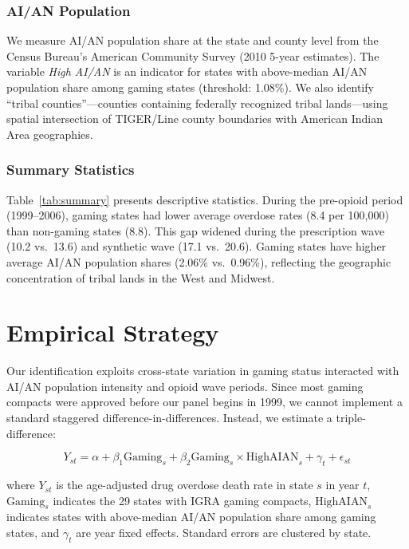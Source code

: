 \documentclass[12pt]{article}
\begin{document}
\subsubsection*{AI/AN Population} We measure AI/AN population share at the state and county level from the Census Bureau's American Community Survey (2010 5-year estimates). The variable \textit{High AI/AN} is an indicator for states with above-median AI/AN population share among gaming states (threshold: 1.08\%). We also identify ``tribal counties''---counties containing federally recognized tribal lands---using spatial intersection of TIGER/Line county boundaries with American Indian Area geographies.

\subsubsection*{Summary Statistics} Table~\ref{tab:summary} presents descriptive statistics. During the pre-opioid period (1999--2006), gaming states had lower average overdose rates (8.4 per 100,000) than non-gaming states (8.8). This gap widened during the prescription wave (10.2 vs.\ 13.6) and synthetic wave (17.1 vs.\ 20.6). Gaming states have higher average AI/AN population shares (2.06\% vs.\ 0.96\%), reflecting the geographic concentration of tribal lands in the West and Midwest.



\section{Empirical Strategy}

Our identification exploits cross-state variation in gaming status interacted with AI/AN population intensity and opioid wave periods. Since most gaming compacts were approved before our panel begins in 1999, we cannot implement a standard staggered difference-in-differences. Instead, we estimate a triple-difference:

\begin{equation}
    Y_{st} = \alpha + \beta_1 \text{Gaming}_s + \beta_2 \text{Gaming}_s \times \text{HighAIAN}_s + \gamma_t + \epsilon_{st}
\end{equation}

where $Y_{st}$ is the age-adjusted drug overdose death rate in state $s$ in year $t$, $\text{Gaming}_s$ indicates the 29 states with IGRA gaming compacts, $\text{HighAIAN}_s$ indicates states with above-median AI/AN population share among gaming states, and $\gamma_t$ are year fixed effects. Standard errors are clustered by state.
\end{document}
